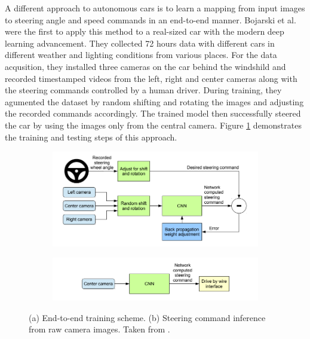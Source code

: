 A different approach to autonomous cars is to learn a mapping from input images
to steering angle and speed commands in an end-to-end manner. Bojarski et al.
\cite{Bojarski2016EndTE} were the first to apply this method to a real-sized
car with the modern deep learning advancement. They collected 72 hours data
with different cars in different weather and lighting conditions from various
places. For the data acqusition, they installed three cameras on the car behind
the windshild and recorded timestamped videos from the left, right and center
cameras along with the steering commands controlled by a human driver. During
training, they agumented the dataset by random shifting and rotating the images
and adjusting the recorded commands accordingly. The trained model then
successfully steered the car by using the images only from the central camera.
Figure \ref{figure:end-to-end-network} demonstrates the training and testing
steps of this approach.

\begin{figure}[h]
  \centering
  \begin{subfigure}[b]{0.4\linewidth}
    \includegraphics[width=\linewidth]{figures/end-to-end-training.png}
    \caption{}
  \end{subfigure}
  \begin{subfigure}[b]{0.4\linewidth}
    \includegraphics[width=\linewidth]{figures/end-to-end-inference.png}
    \caption{}
  \end{subfigure}
  \caption{(a) End-to-end training scheme. (b) Steering command inference from
    raw camera images. Taken from \cite{Bojarski2016EndTE}.}
    \label{figure:end-to-end-network}
\end{figure}

